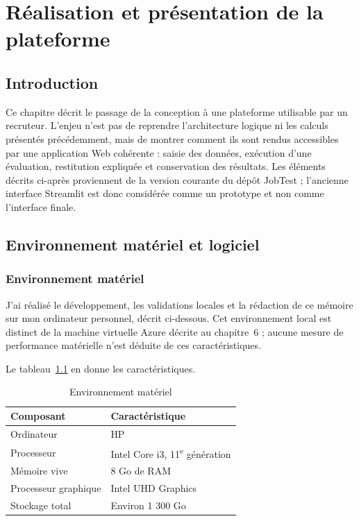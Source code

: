 \chapter{Réalisation et présentation de la plateforme}

\section*{Introduction}

Ce chapitre décrit le passage de la conception à une plateforme utilisable par un recruteur. L'enjeu n'est pas de reprendre l'architecture logique ni les calculs présentés précédemment, mais de montrer comment ils sont rendus accessibles par une application Web cohérente : saisie des données, exécution d'une évaluation, restitution expliquée et conservation des résultats. Les éléments décrits ci-après proviennent de la version courante du dépôt JobTest ; l'ancienne interface Streamlit est donc considérée comme un prototype et non comme l'interface finale.

\section{Environnement matériel et logiciel}

\subsection{Environnement matériel}

J'ai réalisé le développement, les validations locales et la rédaction de ce mémoire sur mon ordinateur personnel, décrit ci-dessous. Cet environnement local est distinct de la machine virtuelle Azure décrite au chapitre~6 ; aucune mesure de performance matérielle n'est déduite de ces caractéristiques.

Le tableau~\ref{tab:chap5-hardware} en donne les caractéristiques.

\begin{table}[H]
\centering
\small
\caption{Environnement matériel}
\label{tab:chap5-hardware}
\begin{tabularx}{.82\textwidth}{|p{}|X|}
\hline
\textbf{Composant} & \textbf{Caractéristique}\\ \hline
Ordinateur & HP\\ \hline
Processeur & Intel Core i3, 11\textsuperscript{e} génération\\ \hline
Mémoire vive & 8 Go de RAM\\ \hline
Processeur graphique & Intel UHD Graphics\\ \hline
Stockage total & Environ 1 300 Go\\ \hline
\end{tabularx}
\end{table}


